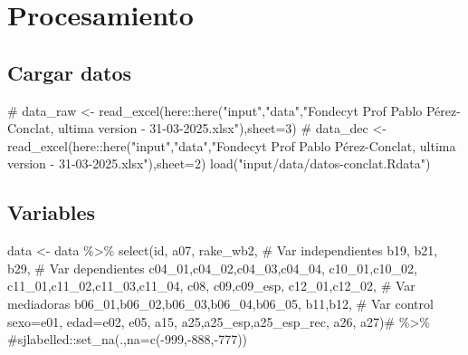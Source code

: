 \documentclass[
  letterpaper,
  DIV=11,
  numbers=noendperiod]{scrreprt}
\newenvironment{Shaded}{\begin{snugshade}}{\end{snugshade}}
\newcommand{\AttributeTok}[1]{\textcolor[rgb]{0.40,0.45,0.13}{#1}}
\newcommand{\CommentTok}[1]{\textcolor[rgb]{0.37,0.37,0.37}{#1}}
\newcommand{\FunctionTok}[1]{\textcolor[rgb]{0.28,0.35,0.67}{#1}}
\newcommand{\NormalTok}[1]{\textcolor[rgb]{0.00,0.23,0.31}{#1}}
\newcommand{\OtherTok}[1]{\textcolor[rgb]{0.00,0.23,0.31}{#1}}
\newcommand{\SpecialCharTok}[1]{\textcolor[rgb]{0.37,0.37,0.37}{#1}}
\newcommand{\StringTok}[1]{\textcolor[rgb]{0.13,0.47,0.30}{#1}}
\begin{document}
\hypertarget{procesamiento}{%
\chapter{Procesamiento}\label{procesamiento}}

\hypertarget{cargar-datos}{%
\section{Cargar datos}\label{cargar-datos}}

\begin{Shaded}
\begin{Highlighting}[]
\CommentTok{\# data\_raw \textless{}{-} read\_excel(here::here("input","data","Fondecyt Prof Pablo Pérez{-}Conclat, ultima version {-} 31{-}03{-}2025.xlsx"),sheet=3)}
\CommentTok{\# data\_dec \textless{}{-} read\_excel(here::here("input","data","Fondecyt Prof Pablo Pérez{-}Conclat, ultima version {-} 31{-}03{-}2025.xlsx"),sheet=2)}
\FunctionTok{load}\NormalTok{(}\StringTok{"input/data/datos{-}conclat.Rdata"}\NormalTok{)}
\end{Highlighting}
\end{Shaded}

\hypertarget{variables}{%
\section{Variables}\label{variables}}

\begin{Shaded}
\begin{Highlighting}[]
\NormalTok{data }\OtherTok{\textless{}{-}}\NormalTok{ data }\SpecialCharTok{\%\textgreater{}\%} 
  \FunctionTok{select}\NormalTok{(id,}
\NormalTok{         a07,}
\NormalTok{         rake\_wb2,}
         \CommentTok{\# Var independientes}
\NormalTok{         b19,}
\NormalTok{         b21,}
\NormalTok{         b29,}
         \CommentTok{\# Var dependientes}
\NormalTok{         c04\_01,c04\_02,c04\_03,c04\_04,}
\NormalTok{         c10\_01,c10\_02,}
\NormalTok{         c11\_01,c11\_02,c11\_03,c11\_04,}
\NormalTok{         c08,}
\NormalTok{         c09,c09\_esp,}
\NormalTok{         c12\_01,c12\_02,}
         \CommentTok{\# Var mediadoras}
\NormalTok{         b06\_01,b06\_02,b06\_03,b06\_04,b06\_05,}
\NormalTok{         b11,b12,}
         \CommentTok{\# Var control}
         \AttributeTok{sexo=}\NormalTok{e01,}
         \AttributeTok{edad=}\NormalTok{e02,}
\NormalTok{         e05,}
\NormalTok{         a15,}
\NormalTok{         a25,a25\_esp,a25\_esp\_rec,}
\NormalTok{         a26,}
\NormalTok{         a27)}\CommentTok{\# \%\textgreater{}\% }
  \CommentTok{\#sjlabelled::set\_na(.,na=c({-}999,{-}888,{-}777))}
\end{Highlighting}
\end{Shaded}
\end{document}
